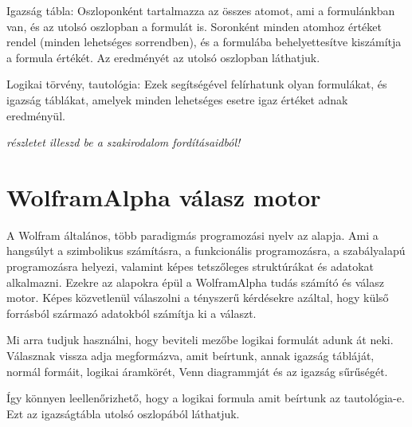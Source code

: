 \documentclass[
]{thesis-ekf}
\theoremstyle{definition}
\theoremstyle{remark}
\begin{document}
	Igazság tábla: Oszloponként tartalmazza az összes atomot, ami a formulánkban van, és az utolsó oszlopban a formulát is. Soronként minden atomhoz értéket rendel (minden lehetséges sorrendben), és a formulába behelyettesítve kiszámítja a formula értékét. Az eredményét az utolsó oszlopban láthatjuk.
	
	Logikai törvény, tautológia: Ezek segítségével felírhatunk olyan formulákat, és igazság táblákat, amelyek minden lehetséges esetre igaz értéket adnak eredményül.

	\emph{részletet illeszd be a szakirodalom fordításaidból!}
	
	\section{WolframAlpha válasz motor}
	A Wolfram általános, több paradigmás programozási nyelv az alapja. Ami a hangsúlyt a szimbolikus számításra, a funkcionális programozásra, a szabályalapú programozásra helyezi, valamint képes tetszőleges struktúrákat és adatokat alkalmazni. Ezekre az alapokra épül a WolframAlpha tudás számító és válasz motor. Képes közvetlenül válaszolni a tényszerű kérdésekre azáltal, hogy külső forrásból származó adatokból számítja ki a választ.
	
	Mi arra tudjuk használni, hogy beviteli mezőbe logikai formulát adunk át neki. Válasznak vissza adja megformázva, amit beírtunk, annak igazság tábláját, normál formáit, logikai áramkörét, Venn diagrammját és az igazság sűrűségét.
	
	Így könnyen leellenőrizhető, hogy a logikai formula amit beírtunk az tautológia-e. Ezt az igazságtábla utolsó oszlopából láthatjuk.
	
\end{document}
